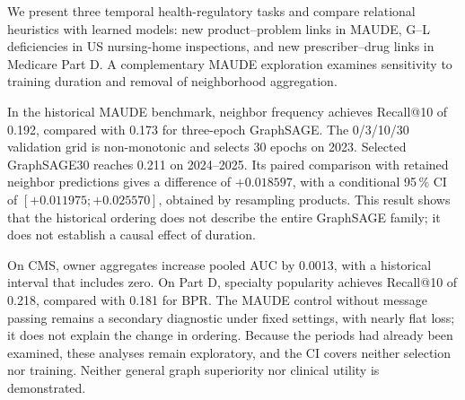 We present three temporal health-regulatory tasks and compare relational heuristics with learned models: new product--problem links in MAUDE, G--L deficiencies in US nursing-home inspections, and new prescriber--drug links in Medicare Part D. A complementary MAUDE exploration examines sensitivity to training duration and removal of neighborhood aggregation.

In the historical MAUDE benchmark, neighbor frequency achieves Recall@10 of 0.192, compared with 0.173 for three-epoch GraphSAGE. The 0/3/10/30 validation grid is non-monotonic and selects 30 epochs on 2023. Selected GraphSAGE30 reaches 0.211 on 2024--2025. Its paired comparison with retained neighbor predictions gives a difference of $+0.018597$, with a conditional 95\,\% CI of $[+0.011975;+0.025570]$, obtained by resampling products. This result shows that the historical ordering does not describe the entire GraphSAGE family; it does not establish a causal effect of duration.

On CMS, owner aggregates increase pooled AUC by 0.0013, with a historical interval that includes zero. On Part D, specialty popularity achieves Recall@10 of 0.218, compared with 0.181 for BPR. The MAUDE control without message passing remains a secondary diagnostic under fixed settings, with nearly flat loss; it does not explain the change in ordering. Because the periods had already been examined, these analyses remain exploratory, and the CI covers neither selection nor training. Neither general graph superiority nor clinical utility is demonstrated.
